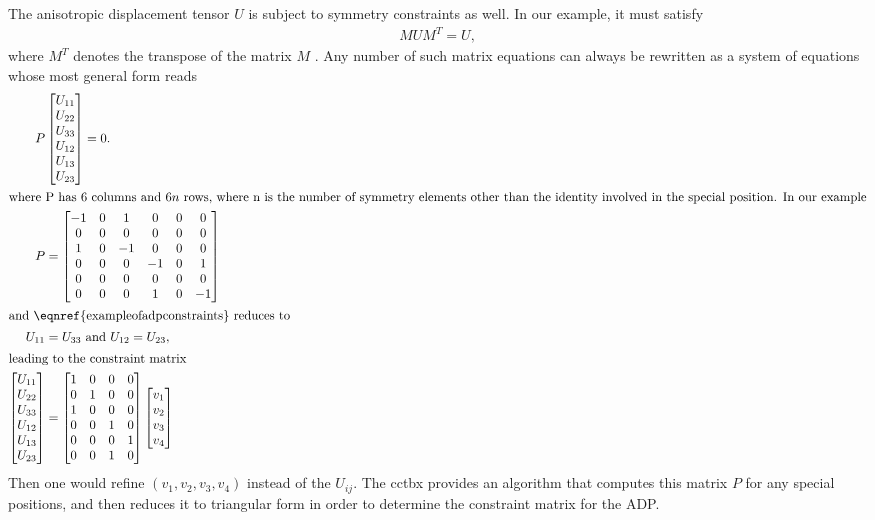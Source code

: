 \documentclass[pdf]{iucr}
\begin{document}
The anisotropic displacement tensor $U$ is subject to symmetry constraints as well. In our example, it must satisfy
\begin{align}
M U M^T = U,
\end{align}
where $M^T$ denotes the transpose of the matrix $M$ \textbookref. Any number of such matrix equations can always be rewritten as a system of equations whose most general form reads
\begin{align}
P &\begin{bmatrix}
U_{11}\\
U_{22}\\
U_{33}\\
U_{12}\\
U_{13}\\
U_{23}\\
\end{bmatrix} = 0.\label{eqn:exampleofadpconstraints}\\
\shortintertext{where P has 6 columns and $6n$ rows, where n is the number of symmetry elements other than the identity involved in the special position. In our example} P &= \begin{bmatrix}
-1 & 0 & 1 & 0 & 0 & 0\\
0 & 0 & 0 & 0 & 0 & 0\\
1 & 0 & -1 & 0 & 0 & 0\\
0 & 0 & 0 & -1 & 0 & 1\\
0 & 0 & 0 & 0 & 0 & 0\\
0 & 0 & 0 & 1 & 0 & -1
\end{bmatrix}\\
\shortintertext{and \eqnref{exampleofadpconstraints} reduces to}
U_{11} &= U_{33}\text{ and } U_{12} = U_{23},\\
\shortintertext{leading to the constraint matrix}
\begin{bmatrix}
U_{11}\\
U_{22}\\
U_{33}\\
U_{12}\\
U_{13}\\
U_{23}\\
\end{bmatrix} &= \begin{bmatrix}
1 & 0 & 0 & 0\\
0 & 1 & 0 & 0\\
1 & 0 & 0 & 0\\
0 & 0 & 1 & 0\\
0 & 0 & 0 & 1\\
0 & 0 & 1 & 0
\end{bmatrix} \begin{bmatrix}
v_1\\
v_2\\
v_3\\
v_4
\end{bmatrix}
\end{align} 
Then one would refine $(v_1, v_2, v_3, v_4)$ instead of the $U_{ij}$.
The cctbx provides an algorithm that computes this matrix $P$ for any special positions, and then reduces it to triangular form in order to determine the constraint matrix for the ADP.
\end{document}
